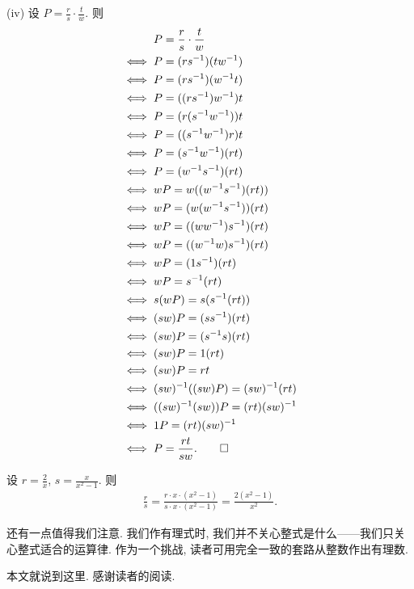 \begin{pf}
    (iv) 设 $P = \frac{r}{s} \cdot \frac{t}{w}$. 则
    \begin{align*}
                & P = \frac{r}{s} \cdot \frac{t}{w}  \\
        \iff {} & P = (rs^{-1}) (tw^{-1})            \\
        \iff {} & P = (rs^{-1}) (w^{-1}t)            \\
        \iff {} & P = ((rs^{-1}) w^{-1}) t           \\
        \iff {} & P = (r (s^{-1} w^{-1})) t          \\
        \iff {} & P = ((s^{-1} w^{-1}) r) t          \\
        \iff {} & P = (s^{-1} w^{-1}) (rt)           \\
        \iff {} & P = (w^{-1} s^{-1}) (rt)           \\
        \iff {} & wP = w ((w^{-1} s^{-1}) (rt))      \\
        \iff {} & wP = (w (w^{-1} s^{-1})) (rt)      \\
        \iff {} & wP = ((ww^{-1}) s^{-1}) (rt)       \\
        \iff {} & wP = ((w^{-1}w) s^{-1}) (rt)       \\
        \iff {} & wP = (1s^{-1}) (rt)                \\
        \iff {} & wP = s^{-1} (rt)                   \\
        \iff {} & s(wP) = s(s^{-1} (rt))             \\
        \iff {} & (sw)P = (ss^{-1}) (rt)             \\
        \iff {} & (sw)P = (s^{-1}s) (rt)             \\
        \iff {} & (sw)P = 1(rt)                      \\
        \iff {} & (sw)P = rt                         \\
        \iff {} & (sw)^{-1} ((sw)P) = (sw)^{-1} (rt) \\
        \iff {} & ((sw)^{-1} (sw))P = (rt) (sw)^{-1} \\
        \iff {} & 1P = (rt) (sw)^{-1}                \\
        \iff {} & P = \frac{rt}{sw}. \qedhere
    \end{align*}
\end{pf}

\begin{example}
    设 $r = \frac{2}{x}$, $s = \frac{x}{x^2 - 1}$. 则
    \begin{align*}
        \frac{r}{s} = \frac{r \cdot x \cdot (x^2 - 1)}{s \cdot x \cdot (x^2 - 1)} = \frac{2(x^2 - 1)}{x^2}.
    \end{align*}
\end{example}

还有一点值得我们注意. 我们作有理式时, 我们并不关心整式是什么——我们只关心整式适合的运算律. 作为一个挑战, 读者可用完全一致的套路从整数作出有理数.

本文就说到这里. 感谢读者的阅读.
